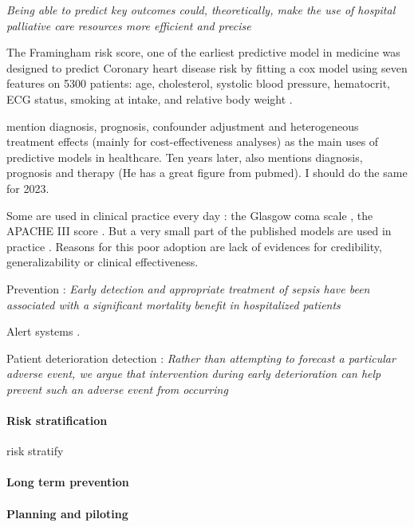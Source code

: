 \documentclass{report}
\begin{document}
\textit{Being able to predict key outcomes could, theoretically, make the use of
  hospital palliative care resources more efficient and precise} \citep{topol2019high}

The Framingham risk score, one of the earliest predictive model in medicine was
designed to predict Coronary heart disease risk by fitting a cox model using
seven features on 5300 patients: age, cholesterol, systolic blood pressure,
hematocrit, ECG status, smoking at intake, and relative body weight
\citep{brand1976multivariate}.

\cite{harrell2001regression} mention diagnosis, prognosis, confounder adjustment
and heterogeneous treatment effects (mainly for cost-effectiveness analyses) as
the main uses of predictive models in healthcare. Ten years later,
\cite{steyerberg2009applications} also mentions diagnosis, prognosis and therapy
(He has a great figure from pubmed). I should do the same for 2023.

Some are used in clinical practice every day : the Glasgow coma scale
\citep{teasdale1974assessment}, the APACHE III score \citep{knaus1991apache}.
But a very small part of the published models are used in practice
\citep{wyatt1995commentary}. Reasons for this poor adoption are lack of
evidences for credibility, generalizability or clinical effectiveness.

Prevention : \textit{Early detection and appropriate treatment of sepsis have
  been associated with a significant mortality benefit in hospitalized patients}
\citep{wong2021external}

Alert systems \citep{yu2018artificial}.

Patient deterioration detection \citep{rothman2013development}: \textit{Rather than attempting to forecast a particular
  adverse event, we argue that intervention during early deterioration can help prevent such an adverse event from
  occurring}

\paragraph{Risk stratification}

risk stratify \citep{tang2007global}

\paragraph{Long term prevention}


\paragraph{Planning and piloting}
\end{document}
